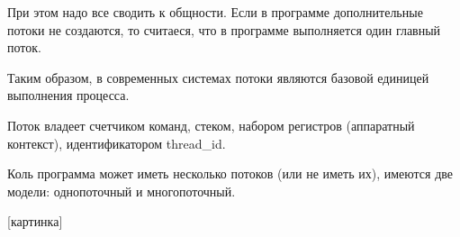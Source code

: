 \documentclass[14pt, a4paper]{article}
\begin{document}
	При этом надо все сводить к общности. Если в программе дополнительные потоки не создаются, то считаеся, что в программе выполняется один главный поток.
	
	Таким образом, в современных системах потоки являются базовой единицей выполнения процесса.
	
	Поток владеет счетчиком команд, стеком, набором регистров (аппаратный контекст), идентификатором thread\_id.
	
	Коль программа может иметь несколько потоков (или не иметь их), имеются две модели: однопоточный и многопоточный.
	
	[картинка]
\end{document}
